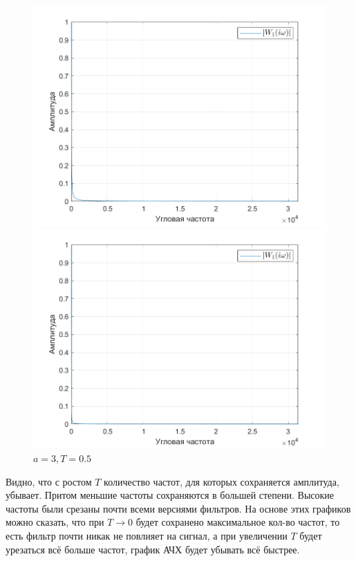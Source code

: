\documentclass[a4paper]{article}
\begin{document}
\begin{figure}[H]
    \begin{minipage}{0.5\textwidth}
        \centering
        \includegraphics[width=\linewidth]{ex1_1/a=3_T=0.1/h5.png}
        \caption{$a = 3, T = 0.1$}
    \end{minipage}
    \begin{minipage}{0.5\textwidth}
        \centering
        \includegraphics[width=\linewidth]{ex1_1/a=3_T=0.5/h5.png}
        \caption{$a = 3, T = 0.5$}
    \end{minipage}
\end{figure}

Видно, что с ростом $T$ количество частот, для которых сохраняется амплитуда, убывает. Притом меньшие частоты сохраняются в большей степени. Высокие частоты были срезаны почти всеми версиями фильтров. На основе этих графиков можно сказать, что при $T \to 0$ будет сохранено максимальное кол-во частот, то есть фильтр почти никак не повлияет на сигнал, а при увеличении $T$ будет урезаться всё больше частот, график АЧХ будет убывать всё быстрее.\
\end{document}
